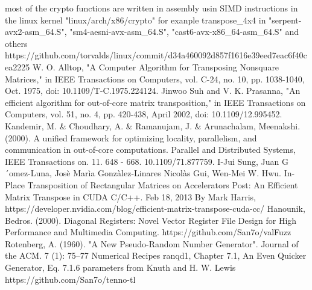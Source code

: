 \documentclass[conference]{IEEEtran}
\begin{document}
\begin{thebibliography}{00}
 most of the crypto functions are written in assembly usin SIMD instructions in the
linux kernel "linux/arch/x86/crypto" for exanple transpose\_4x4 in "serpent-avx2-asm\_64.S", "sm4-aesni-avx-asm\_64.S",
"cast6-avx-x86\_64-asm\_64.S" and others
 https://github.com/torvalds/linux/commit/d34a460092d857f1616e39eed7eac6f40cea2225
 W. O. Alltop, "A Computer Algorithm for Transposing Nonsquare Matrices," in IEEE Transactions on Computers, vol. C-24, no. 10, pp. 1038-1040, Oct. 1975, doi: 10.1109/T-C.1975.224124.
 Jinwoo Suh and V. K. Prasanna, "An efficient algorithm for out-of-core matrix transposition," in IEEE Transactions on Computers, vol. 51, no. 4, pp. 420-438, April 2002, doi: 10.1109/12.995452.
 Kandemir, M. \& Choudhary, A. \& Ramanujam, J. \& Arunachalam, Meenakshi. (2000). A unified framework for optimizing locality, parallelism, and communication in out-of-core computations. Parallel and Distributed Systems, IEEE Transactions on. 11. 648 - 668. 10.1109/71.877759. 
 I-Jui Sung, Juan G´omez-Luna, Josè Marìa Gonzàlez-Linares
Nicolàs Gui, Wen-Mei W. Hwu. In-Place Transposition of Rectangular Matrices on Accelerators
 Post: An Efficient Matrix Transpose in CUDA C/C++. Feb 18, 2013 By Mark Harris, https://developer.nvidia.com/blog/efficient-matrix-transpose-cuda-cc/
 Hanounik, Bedros. (2000). Diagonal Registers: Novel Vector Register File Design for High Performance and Multimedia Computing. 
 https://github.com/San7o/valFuzz
 Rotenberg, A. (1960). "A New Pseudo-Random Number Generator". Journal of the ACM. 7 (1): 75–77
 Numerical Recipes ranqd1, Chapter 7.1, An Even Quicker Generator, Eq. 7.1.6
parameters from Knuth and H. W. Lewis
 https://github.com/San7o/tenno-tl
\end{thebibliography}
\vspace{12pt}
\end{document}
